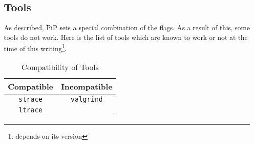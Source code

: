 \subsection{Tools}

As described, PiP sets a special combination of the 
flags. As a result of this, some tools do not work. Here is the list
of tools which are known to work or not at the time of this
writing\footnote{ depends on its version}. 

\begin{table}[ht]
  \centering
  \caption{Compatibility of Tools}
  \vspace{3mm}
  \begin{tabular}{c|c}
    \hline
    Compatible & Incompatible \\
    \hline
        {\tt strace} & {\tt valgrind} \\
        {\tt ltrace} \\
        \hline
  \end{tabular}
\end{table}

